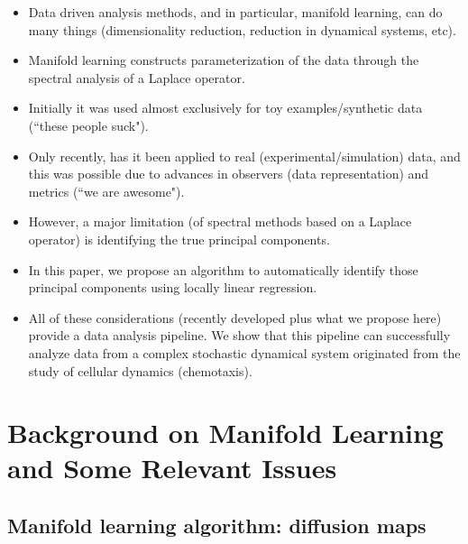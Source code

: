 \documentclass[preprint]{elsarticle}
\begin{document}
\begin{itemize}

\item
Data driven analysis methods, and in particular, manifold learning, can do many things (dimensionality reduction, reduction in dynamical systems, etc). 

\item
Manifold learning constructs parameterization of the data through the spectral analysis of a Laplace operator.

\item
Initially it was used almost exclusively for toy examples/synthetic data (``these people suck").

\item
Only recently, has it been applied to real (experimental/simulation) data, and this was possible due to advances in observers (data representation) and metrics (``we are awesome"). 

\item
However, a major limitation (of spectral methods based on a Laplace operator) is identifying the true principal components.

\item
In this paper, we propose an algorithm to automatically identify those principal components using locally linear regression.

\item
All of these considerations (recently developed plus what we propose here) provide a data analysis pipeline. We show that this pipeline can successfully analyze data from a complex stochastic dynamical system originated from the study of cellular dynamics (chemotaxis).

\end{itemize}





\section{Background on Manifold Learning and Some Relevant Issues}

\subsection{Manifold learning algorithm: diffusion maps}
\end{document}
